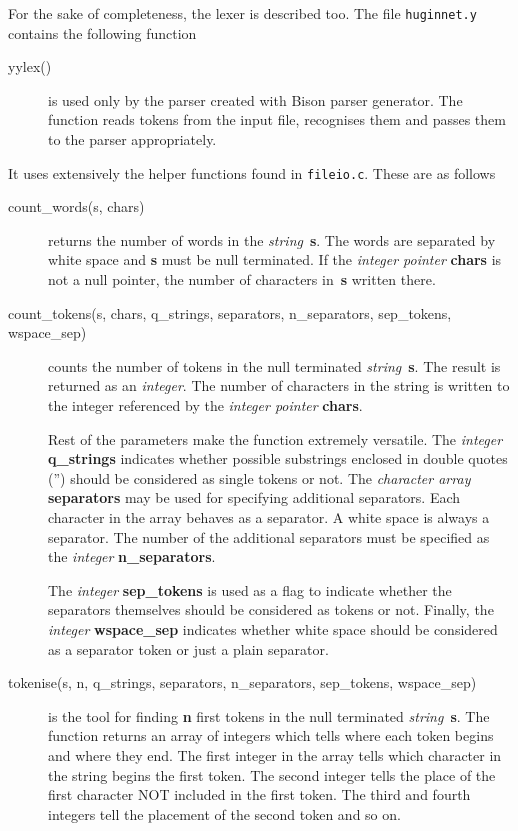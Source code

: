 \documentclass[12pt,a4paper]{report}
\begin{document}
For the sake of completeness, the lexer is described too. The file 
\verb+huginnet.y+ contains the following function
\begin{description}
\item[yylex()] is used only by the parser created with Bison parser
generator. The function reads tokens from the input file, recognises
them and passes them to the parser appropriately.
\end{description}
It uses extensively the helper functions found in
\verb+fileio.c+. These are as follows
\begin{description}
\item[count\_words(s, chars)] returns the number of words in the 
{\it string}~\textbf{s}. The words are separated by white space and
\textbf{s} must be null terminated. If the {\it integer pointer}
\textbf{chars} is not a null pointer, the number of characters
in~\textbf{s} written there.

\item[count\_tokens(s, chars, q\_strings, separators,
n\_separators, sep\_tokens, wspace\_sep)] counts the number of
tokens in the null terminated {\it string}~\textbf{s}. The result is
returned as an {\it integer}. The number of characters in the string
is written to the integer referenced by the {\it integer pointer}
\textbf{chars}. 

Rest of the parameters make the function extremely versatile. The 
{\it integer} \textbf{q\_strings} indicates whether possible
substrings enclosed in double quotes ('') should be considered as
single tokens or not. The {\it character array} \textbf{separators} 
may be used for specifying additional separators. Each character in the 
array behaves as a separator. A white space is always a separator. The
number of the additional separators must be specified as the {\it
integer} \textbf{n\_separators}.

The {\it integer} \textbf{sep\_tokens} is used as a flag to indicate
whether the separators themselves should be considered as tokens or
not. Finally, the {\it integer} \textbf{wspace\_sep} indicates whether
white space should be considered as a separator token or just a plain 
separator.

\item[tokenise(s, n, q\_strings, separators, n\_separators, 
sep\_tokens, wspace\_sep)] is the tool for finding \textbf{n} first 
tokens in the null terminated {\it string}~\textbf{s}. The function 
returns an {array of integers} which tells where each token begins 
and where they end. The first integer in the array tells which
character in the string begins the first token. The second
integer tells the place of the first character NOT included in the
first token. The third and fourth integers tell the placement of the
second token and so on.


\end{description}
\end{document}
